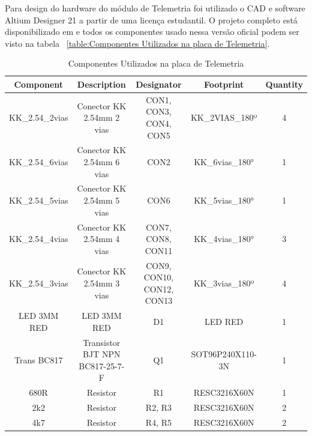 \documentclass[../poliXuniversity_hospital_-USP-report.tex]{subfiles}
\begin{document}
Para design do hardware do módulo de Telemetria foi utilizado o CAD e software Altium Designer 21 \cite{altium21} a partir de uma licença estudantil. O projeto completo está disponibilizado em \cite{github_modulos} e todos os componentes usado nessa versão oficial podem ser visto na tabela ~\ref{table:Componentes Utilizados na placa de Telemetria}.

\begin{table}[!h]
\caption{Componentes Utilizados na placa de Telemetria}
\centering
\begin{adjustbox}{width=\columnwidth,center}
\begin{tabular}{|c|c|c|c|c|}

\hline
Component        & Description                                    & Designator                  & Footprint           & Quantity \\ \hline
KK\_2.54\_2vias  & Conector KK 2.54mm 2   vias                    & CON1, CON3, CON4,   CON5    & KK\_2VIAS\_180º     & 4        \\ \hline
KK\_2.54\_6vias  & Conector KK 2.54mm 6   vias                    & CON2                        & KK\_6vias\_180°     & 1        \\ \hline
KK\_2.54\_5vias  & Conector KK 2.54mm 5   vias                    & CON6                        & KK\_5vias\_180°     & 1        \\ \hline
KK\_2.54\_4vias  & Conector KK 2.54mm 4   vias                    & CON7, CON8, CON11           & KK\_4vias\_180°     & 3        \\ \hline
KK\_2.54\_3vias  & Conector KK 2.54mm 3   vias                    & CON9, CON10, CON12,   CON13 & KK\_3vias\_180º     & 4        \\ \hline
LED 3MM RED      & LED 3MM RED                                    & D1                          & LED RED             & 1        \\ \hline
Trans BC817      & Transistor BJT NPN   BC817-25-7-F              & Q1                          & SOT96P240X110-3N    & 1        \\ \hline
680R             & Resistor                                       & R1                          & RESC3216X60N        & 1        \\ \hline
2k2              & Resistor                                       & R2, R3                      & RESC3216X60N        & 2        \\ \hline
4k7              & Resistor                                       & R4, R5                      & RESC3216X60N        & 2        \\ \hline

\end{tabular}
\end{adjustbox}
\end{table}
\end{document}

